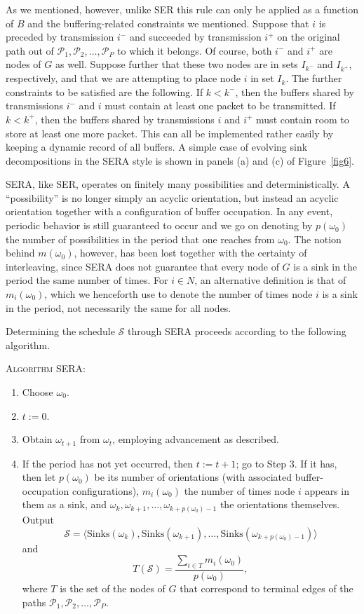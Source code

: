\documentclass{article}
\begin{document}
As we mentioned, however, unlike SER this rule can only be applied as a function
of $B$ and the buffering-related constraints we mentioned. Suppose that $i$ is
preceded by transmission $i^-$ and succeeded by transmission $i^+$ on the
original path out of $\mathcal{P}_1,\mathcal{P}_2,\ldots,\mathcal{P}_P$ to which
it belongs. Of course, both $i^-$ and $i^+$ are nodes of $G$ as well. Suppose
further that these two nodes are in sets $I_{k^-}$ and $I_{k^+}$, respectively,
and that we are attempting to place node $i$ in set $I_k$. The further
constraints to be satisfied are the following. If $k<k^-$, then the buffers
shared by transmissions $i^-$ and $i$ must contain at least one packet to be
transmitted. If $k<k^+$, then the buffers shared by transmissions $i$ and $i^+$
must contain room to store at least one more packet. This can all be implemented
rather easily by keeping a dynamic record of all buffers. A simple case of
evolving sink decompositions in the SERA style is shown in panels (a) and (c) of
Figure~\ref{fig6}.

SERA, like SER, operates on finitely many possibilities and deterministically.
A ``possibility'' is no longer simply an acyclic orientation, but instead an
acyclic orientation together with a configuration of buffer occupation. In any
event, periodic behavior is still guaranteed to occur and we go on denoting by
$p(\omega_0)$ the number of possibilities in the period that one reaches from
$\omega_0$. The notion behind $m(\omega_0)$, however, has been lost together
with the certainty of interleaving, since SERA does not guarantee that every
node of $G$ is a sink in the period the same number of times. For $i\in N$, an
alternative definition is that of $m_i(\omega_0)$, which we henceforth use to
denote the number of times node $i$ is a sink in the period, not necessarily the
same for all nodes.

Determining the schedule $\mathcal{S}$ through SERA proceeds according to the
following algorithm.

\bigskip\noindent
\textsc{Algorithm} SERA:
\begin{enumerate}
\item Choose $\omega_0$.
\item $t := 0$.
\item Obtain $\omega_{t+1}$ from $\omega_t$, employing advancement as described.
\item If the period has not yet occurred, then $t:=t+1$; go to Step 3. If it
has, then let $p(\omega_0)$ be its number of orientations (with associated
buffer-occupation configurations), $m_i(\omega_0)$ the number of times node $i$
appears in them as a sink, and
$\omega_k,\omega_{k+1},\ldots,\omega_{k+p(\omega_0)-1}$ the orientations
themselves. Output
$$
\mathcal{S}=
\langle\mathrm{Sinks}(\omega_k),\mathrm{Sinks}(\omega_{k+1}),\ldots,
\mathrm{Sinks}(\omega_{k+p(\omega_0)-1})\rangle
$$
and
$$
T(\mathcal{S})=
\frac{\sum_{i\in T}m_i(\omega_0)}{p(\omega_0)},
$$
where $T$ is the set of the nodes of $G$ that correspond to terminal edges of
the paths $\mathcal{P}_1,\mathcal{P}_2,\ldots,\mathcal{P}_P$.
\end{enumerate}
\end{document}
